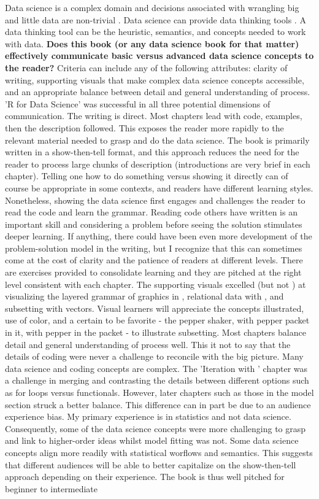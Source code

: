 \documentclass[bookreview]{jss}
\begin{document}
Data science is a complex domain and decisions associated with wrangling big and little data are non-trivial \citep{Gandomi2015, Peters2014, Marx2013}. Data science can provide data thinking tools \citep{Baumer2015}. A data thinking tool can be the heuristic, semantics, and concepts needed to work with data. \textbf{Does this book (or any data science book for that matter) effectively communicate basic versus advanced data science concepts to the reader?} Criteria can include any of the following attributes: clarity of writing, supporting visuals that make complex data science concepts accessible, and an appropriate balance between detail and general understanding of process. 'R for Data Science' was successful in all three potential dimensions of communication. The writing is direct. Most chapters lead with code, examples, then the description followed. This exposes the reader more rapidly to the relevant material needed to grasp and do the data science. The book is primarily written in a show-then-tell format, and this approach reduces the need for the reader to process large chunks of description (introductions are very brief in each chapter). Telling one how to do something versus showing it directly can of course be appropriate in some contexts, and readers have different learning styles. Nonetheless, showing the data science first engages and challenges the reader to read the  code and learn the grammar. Reading code others have written is an important skill and considering a problem before seeing the solution stimulates deeper learning. If anything, there could have been even more development of the problem-solution model in the writing, but I recognize that this can sometimes come at the cost of clarity and the patience of readers at different levels. There are exercises provided to consolidate learning and they are pitched at the right level consistent with each chapter. The supporting visuals excelled (but not ) at visualizing the layered grammar of graphics in , relational data with , and subsetting with vectors. Visual learners will appreciate the concepts illustrated, use of color, and a certain to be favorite - the pepper shaker, with pepper packet in it, with pepper in the packet - to illustrate subsetting. Most chapters balance detail and general understanding of process well. This it not to say that the details of coding were never a challenge to reconcile with the big picture. Many data science and coding concepts are complex. The 'Iteration with ' chapter was a challenge in merging and contrasting the details between different options such as for loops versus functionals. However, later chapters such as those in the model section struck a better balance. This difference can in part be due to an audience experience bias. My primary experience is in statistics and not data science. Consequently, some of the data science concepts were more challenging to grasp and link to higher-order ideas whilst model fitting was not. Some data science concepts align more readily with statistical worflows and semantics. This suggests that different audiences will be able to better capitalize on the show-then-tell approach depending on their experience. The book is thus well pitched for beginner to intermediate 
\end{document}
